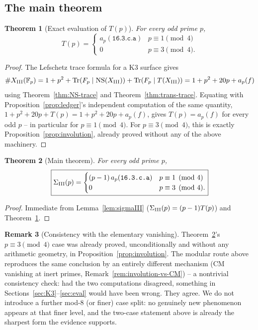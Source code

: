 \documentclass[11pt]{amsart}
\newtheorem{theorem}{Theorem}[section]
\theoremstyle{definition}
\newtheorem{remark}[theorem]{Remark}
\newcommand{\Fp}{\mathbb{F}_p}
\newcommand{\NS}{\mathrm{NS}}
\DeclareMathOperator{\Tr}{Tr}
\begin{document}
\subsection{The main theorem}

\begin{theorem}[Exact evaluation of $T(p)$]
\label{thm:Tp}
For every odd prime $p$,
\[
T(p) = \begin{cases} a_p(\texttt{16.3.c.a}) & p\equiv1\pmod4\\ 0 & p\equiv3\pmod4.\end{cases}
\]
\end{theorem}

\begin{proof}
The Lefschetz trace formula for a K3 surface gives
\[
\#X_{\rm III}(\Fp) = 1+p^2+\Tr(F_p\mid\NS(X_{\rm III}))+\Tr(F_p\mid T(X_{\rm III})) = 1+p^2+20p+a_p(f)
\]
using Theorem~\ref{thm:NS-trace} and Theorem~\ref{thm:trans-trace}.
Equating with Proposition~\ref{prop:ledger}'s independent computation of
the same quantity, $1+p^2+20p+T(p) = 1+p^2+20p+a_p(f)$, gives
$T(p)=a_p(f)$ for every odd $p$ -- in particular for $p\equiv1\pmod4$.
For $p\equiv3\pmod4$, this is exactly Proposition~\ref{prop:involution},
already proved without any of the above machinery.
\end{proof}

\begin{theorem}[Main theorem]
\label{thm:main}
For every odd prime $p$,
\[
\boxed{\Sigma_{\rm III}(p) = \begin{cases}(p-1)\,a_p(\texttt{16.3.c.a}) & p\equiv1\pmod4\\ 0 & p\equiv3\pmod4.\end{cases}}
\]
\end{theorem}

\begin{proof}
Immediate from Lemma~\ref{lem:sigmaIII} ($\Sigma_{\rm III}(p)=(p-1)T(p)$)
and Theorem~\ref{thm:Tp}.
\end{proof}

\begin{remark}[Consistency with the elementary vanishing]
\label{rem:consistency}
Theorem~\ref{thm:main}'s $p\equiv3\pmod4$ case was already proved,
unconditionally and without any arithmetic geometry, in
Proposition~\ref{prop:involution}. The modular route above reproduces the
same conclusion by an entirely different mechanism (CM vanishing at inert
primes, Remark~\ref{rem:involution-vs-CM}) -- a nontrivial consistency
check: had the two computations disagreed, something in
Sections~\ref{sec:K3}--\ref{sec:eval} would have been wrong. They agree.
We do not introduce a further mod-$8$ (or finer) case split: no genuinely
new phenomenon appears at that finer level, and the two-case statement
above is already the sharpest form the evidence supports.
\end{remark}
\end{document}
